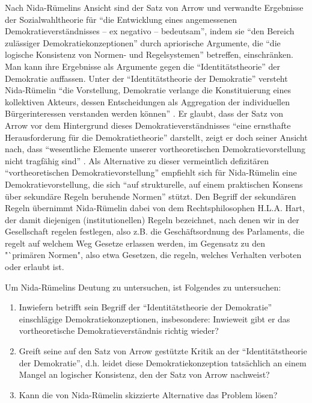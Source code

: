 Nach Nida-Rümelins Ansicht sind der Satz von Arrow und verwandte Ergebnisse der
Sozialwahltheorie für "`die Entwicklung eines angemessenen
Demokratieverständnisses -- ex negativo -- bedeutsam"', indem sie "`den Bereich
zulässiger Demokratiekonzeptionen"' durch apriorische Argumente, die "`die
logische Konsistenz von Normen- und Regelsystemen"' betreffen, einschränken. Man
kann ihre Ergebnisse als Argumente gegen die "`Identitätstheorie"' der Demokratie
auffassen. Unter der "`Identitätstheorie der Demokratie"' versteht Nida-Rümelin
"`die Vorstellung, Demokratie verlange die Konstituierung eines kollektiven
Akteurs, dessen Entscheidungen als Aggregation der individuellen Bürgerinteressen
verstanden werden können"' \cite[S. 185]{nida-ruemelin:1991}. Er glaubt, dass der
Satz von Arrow vor dem Hintergrund dieses Demokratieverständnisses "`eine
ernsthafte Herausforderung für die Demokratietheorie"' \cite[S.
186]{nida-ruemelin:1991} darstellt, zeigt er doch seiner Ansicht nach, dass
"`wesentliche Elemente unserer vortheoretischen Demokratievorstellung nicht
tragfähig sind"' \cite[S. 187]{nida-ruemelin:1991}. Als Alternative zu dieser
vermeintlich defizitären "`vortheoretischen Demokratievorstellung"' empfiehlt
sich für Nida-Rümelin eine Demokratievorstellung, die sich "`auf strukturelle,
auf einem praktischen Konsens über sekundäre Regeln beruhende Normen"' \cite[S.
186]{nida-ruemelin:1991} stützt. Den Begriff der sekundären Regeln übernimmt
Nida-Rümelin dabei von dem Rechtsphilosophen H.L.A. Hart, der damit diejenigen
(institutionellen) Regeln bezeichnet, nach denen wir in der Gesellschaft regelen
festlegen, also z.B. die Geschäftsordnung des Parlaments, die regelt auf welchem
Weg Gesetze erlassen werden, im Gegensatz zu den "`primären Normen", also etwa
Gesetzen, die regeln, welches Verhalten verboten oder erlaubt ist.

Um Nida-Rümelins Deutung zu untersuchen, ist Folgendes zu untersuchen:

\begin{enumerate}
  \item Inwiefern betrifft sein Begriff der "`Identitätstheorie der
  Demokratie"' einschlägige Demokratiekonzeptionen, insbesondere: Inwieweit
  gibt er das vortheoretische Demokratieverständnis richtig wieder?
  \item Greift seine auf den Satz von Arrow gestützte Kritik an der
  "`Identitätstheorie der Demokratie"', d.h. leidet diese Demokratiekonzeption
  tatsächlich an einem Mangel an logischer Konsistenz, den der Satz von Arrow
  nachweist?
  \item Kann die von Nida-Rümelin skizzierte Alternative das Problem lösen?
\end{enumerate}

